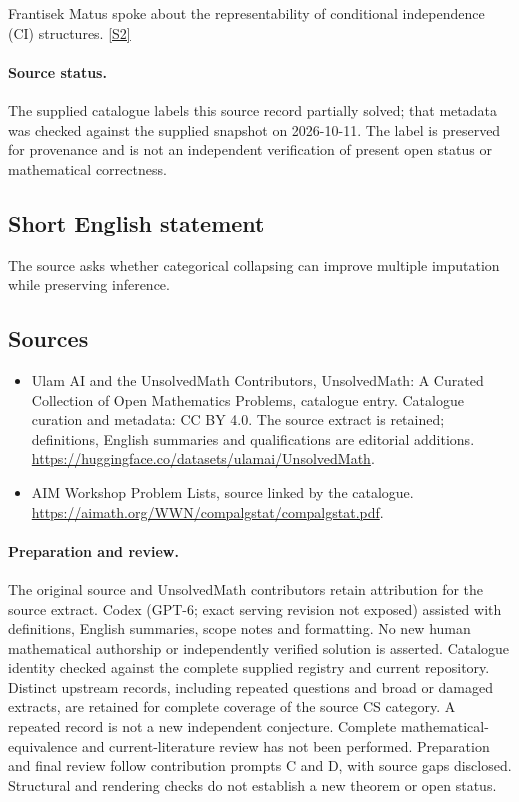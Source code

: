 \documentclass[11pt]{article}
\newcommand{\sref}[2]{\hyperlink{source:#1:#2}{[S#2]}}
\begin{document}
Frantisek Matus spoke about the representability of conditional independence (CI) structures. \sref{statement}{2}
\paragraph{Source status.}
The supplied catalogue labels this source record partially solved; that metadata was checked against the supplied snapshot on 2026-10-11. The label is preserved for provenance and is not an independent verification of present open status or mathematical correctness.
\subsection{Short English statement}
The source asks whether categorical collapsing can improve multiple imputation while preserving inference.
\subsection{Sources}
\begin{itemize}
\item[\hypertarget{source:statement:1}{S1}] Ulam AI and the UnsolvedMath Contributors, UnsolvedMath: A Curated Collection of Open Mathematics Problems, catalogue entry. Catalogue curation and metadata: CC BY 4.0. The source extract is retained; definitions, English summaries and qualifications are editorial additions.
\url{https://huggingface.co/datasets/ulamai/UnsolvedMath}.
\item[\hypertarget{source:statement:2}{S2}] AIM Workshop Problem Lists, source linked by the catalogue.
\url{https://aimath.org/WWN/compalgstat/compalgstat.pdf}.
\end{itemize}
\paragraph{Preparation and review.}
The original source and UnsolvedMath contributors retain attribution for the source extract. Codex (GPT-6; exact serving revision not exposed) assisted with definitions, English summaries, scope notes and formatting. No new human mathematical authorship or independently verified solution is asserted. Catalogue identity checked against the complete supplied registry and current repository. Distinct upstream records, including repeated questions and broad or damaged extracts, are retained for complete coverage of the source CS category. A repeated record is not a new independent conjecture. Complete mathematical-equivalence and current-literature review has not been performed. Preparation and final review follow contribution prompts C and D, with source gaps disclosed. Structural and rendering checks do not establish a new theorem or open status.
\label{end:statement}
\end{document}
